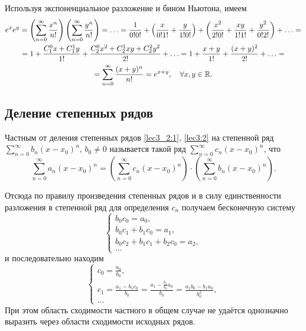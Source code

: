 \documentclass[../../main.tex]{subfiles}
\begin{document}
    \begin{example}
        Используя экспоненциальное разложение и бином Ньютона, имеем
        \begin{multline*} 
            e^xe^y = \left(\sum\limits_{n = 0}^{\infty}\frac{x^n}{n!} \right)
            \left(\sum\limits_{n = 0}^{\infty}\frac{y^n}{n!} \right) = \ldots 
            = 
            \frac{1}{0!0!} + \left(\frac x{0!1!} + \frac y {1!0!}\right) + 
            \left(\frac{x^2}{2!0!} + \frac{xy}{1!1!} + \frac{y^2}{0!2!}\right) 
            + \ldots = \\ = 1 + \frac{C_1^0 x + C_1^1 y}{1!} + \frac{C_2^0 x^2 
            + C_2^1xy + C_2^2 y^2}{2!} + \ldots = 1 + \frac{x + y}{1!} + 
            \frac{(x + y)^2}{2!} + \ldots = \\ = \sum\limits_{n = 0}^{\infty} 
            \frac{(x + y)^n}{n!} = e^{x + y}, \quad \forall x, y \in \mathbb{R}.
        \end{multline*}
    \end{example}

    \subsection{Деление степенных рядов}

    Частным от деления степенных рядов \eqref{lec3_2:1}, \eqref{lec3:2} на 
    степенной ряд $\sum\limits_{n = 0}^{\infty}b_n(x - x_0)^n, \, b_0 
    \ne 0$ называется такой ряд $\sum\limits_{n = 0}^{\infty}c_n(x - x_0)^n$, 
    что 
    \[\sum\limits_{n = 0}^{\infty}a_n(x - x_0)^n = 
    \left(\sum\limits_{n = 0}^{\infty}c_n(x - x_0)^n\right) \cdot 
    \left(\sum\limits_{n = 0}^{\infty}b_n(x - x_0)^n\right). \]
    
    Отсюда по правилу произведения степенных рядов и в силу единственности 
    разложения в степенной ряд для определения $c_n$ получаем бесконечную 
    систему 
    \[
    \begin{cases}
        b_0c_0 = a_0, \\ 
        b_0c_1 + b_1c_0 = a_1, \\
        b_0c_2 + b_1c_1 + b_2c_0 = a_2, \\
        \ldots
    \end{cases} 
    \]
    и последовательно находим
    \[ 
    \begin{cases}
    c_0 = \frac{a_0}{b_0}, \\ 
    c_1 = \frac{a_1 - b_1c_0}{b_0} = \frac{a_1 - \frac{b_1}{b_0}a_0}{b_0} = 
        \frac{a_1b_0-b_1a_0}{b_0^2}, \\
    \ldots
    \end{cases} 
    \]
    При этом область сходимости частного в общем случае не удаётся однозначно 
    выразить через области сходимости исходных рядов.
\end{document}
